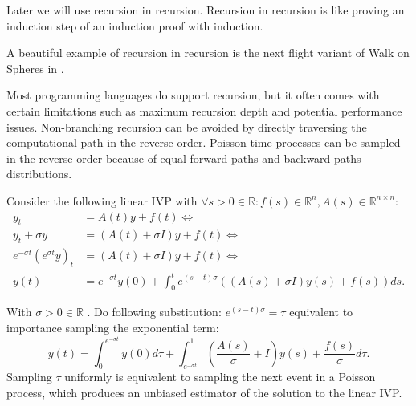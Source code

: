 \documentclass[a4paper,12pt]{article}
\begin{document}
\begin{technique}\label{tech:recu in recu}
  Later we will use recursion in recursion.
  Recursion in recursion is like proving an induction
  step of an induction proof with induction.
\end{technique}

\begin{related}
  A beautiful example of recursion in recursion is
  the next flight variant of Walk on Spheres in
  \cite{sawhney_grid-free_2022}.
\end{related}

Most programming languages do support recursion, but it often comes with certain
limitations such as maximum recursion depth and potential performance issues.
Non-branching recursion can be avoided by directly traversing the computational path in the
reverse order. Poisson time processes can be sampled in the reverse order
because of equal forward paths and backward paths distributions.

\begin{definition} \label{def:main poisson}
  Consider the following linear IVP with $\forall s>0 \in \mathbb{R}: f(s) \in \mathbb{R}^{n}, A(s) \in \mathbb{R}^{n \times n}$:
  \begin{align}
    y_t                              & = A(t) y + f(t) \Leftrightarrow                                                                       \\
    y_t + \sigma y                   & = (A(t) + \sigma I) y + f(t) \Leftrightarrow                                                          \\
    e^{-\sigma t} ( e^{\sigma t}y)_t & = (A(t) + \sigma I) y + f(t)  \Leftrightarrow                                                         \\
    y(t)                             & = e^{-\sigma t} y(0) + \int_{0}^{t} e^{(s-t) \sigma} \left(  (A(s) + \sigma I ) y(s) +f(s)\right) ds.
  \end{align}

  With $\sigma>0 \in \mathbb{R}$ . Do following substitution: $e^{(s-t)\sigma} = \tau$ equivalent to importance sampling
  the exponential term:
  \begin{equation} \label{eq:poisson main}
    y(t) = \int_{0}^{e^{-\sigma t}}  y(0) d\tau + \int_{e^{-\sigma t}}^{1} \left(  \frac{A(s)}{\sigma} + I\right)  y(s) + \frac{f(s)}{\sigma} d\tau
    .
  \end{equation}
  Sampling $\tau$ uniformly is equivalent to sampling the next event in a Poisson process,
  which produces an unbiased estimator of the solution to the linear IVP.
\end{definition}
\end{document}
